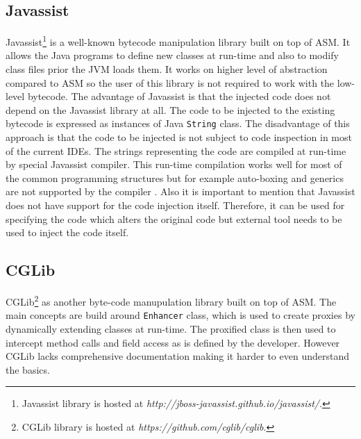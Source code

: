 \subsection{Javassist}
\label{javassist}
Javassist\footnote{Javassist library is hosted at \textit{http://jboss-javassist.github.io/javassist/}.} is a well-known bytecode manipulation library built on top of ASM. It allows the Java programs to define new classes at run-time and also to modify class files prior the JVM loads them. It works on higher level of abstraction compared to ASM so the user of this library is not required to work with the low-level bytecode. The advantage of Javassist is that the injected code does not depend on the Javassist library at all. The code to be injected to the existing bytecode is expressed as instances of Java \texttt{String} class. The disadvantage of this approach is that the code to be injected is not subject to code inspection in most of the current IDEs. The strings representing the code are compiled at run-time by special Javassist compiler. This run-time compilation works well for most of the common programming structures but for example auto-boxing and generics are not supported by the compiler \cite{JAVASSIST}. Also it is important to mention that Javassist does not have support for the code injection itself. Therefore, it can be used for specifying the code which alters the original code but external tool needs to be used to inject the code itself.
\subsection{CGLib}
\label{cglib}
CGLib\footnote{CGLib library is hosted at \textit{https://github.com/cglib/cglib}.} as another byte-code manupulation library built on top of ASM. The main concepts are build around \texttt{Enhancer} class, which is used to create proxies by dynamically extending classes at run-time. The proxified class is then used to intercept method calls and field access as is defined by the developer. However CGLib lacks comprehensive documentation making it harder to even understand the basics.


